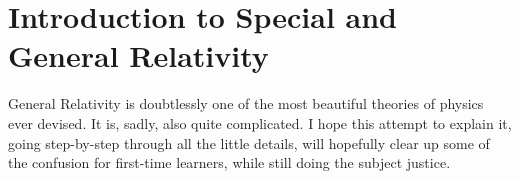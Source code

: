 \chapter{Introduction to Special and General Relativity}

General Relativity is doubtlessly one of the most beautiful theories of physics ever devised. It is, sadly, also quite complicated. I hope this attempt to explain it, going step-by-step through all the little details, will hopefully clear up some of the confusion for first-time learners, while still doing the subject justice.